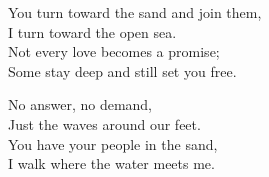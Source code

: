 \begin{lyrics}
You turn toward the sand and join them,\\
I turn toward the open sea.\\
Not every love becomes a promise;\\
Some stay deep and still set you free.

No answer, no demand,\\
Just the waves around our feet.\\
You have your people in the sand,\\
I walk where the water meets me.
\end{lyrics}

